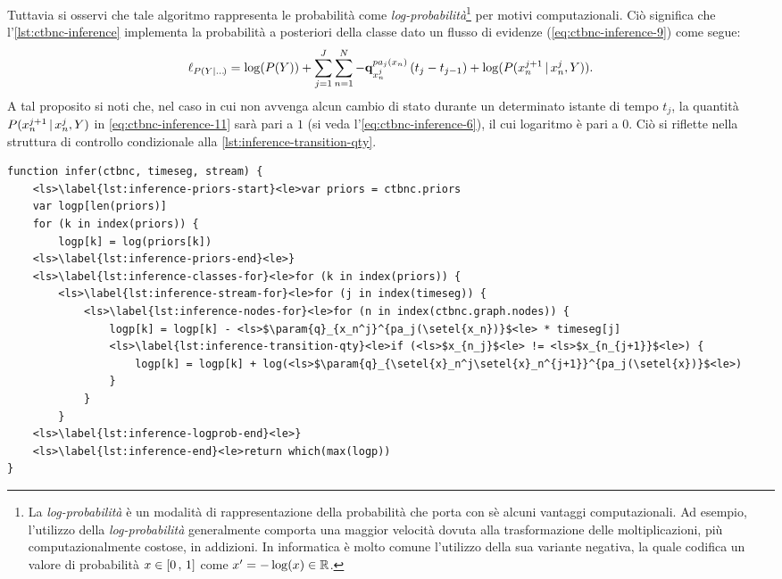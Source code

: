 Tuttavia si osservi che tale algoritmo rappresenta le probabilità come \emph{log-probabilità}\footnote{La \emph{log-probabilità} è un modalità di rappresentazione della probabilità che porta con sè alcuni vantaggi computazionali. Ad esempio, l'utilizzo della \emph{log-probabilità} generalmente comporta una maggior velocità dovuta alla trasformazione delle moltiplicazioni, più computazionalmente costose, in addizioni. In informatica è molto comune l'utilizzo della sua variante negativa, la quale codifica un valore di probabilità $\mathnormal{x} \in [0\,,\,1]$ come $\mathnormal{x}^{\prime}=-\log(\mathnormal{x}) \in \mathbb{R}$.} per motivi computazionali. Ciò significa che l'\autoref{lst:ctbnc-inference} implementa la probabilità a posteriori della classe dato un flusso di evidenze (\autoref{eq:ctbnc-inference-9}) come segue:
\small
\begin{equation}\label{eq:ctbnc-inference-11}
\ell_{P(\mathnormal{Y}|\dots\negthinspace{})} = \log (P(\mathnormal{Y})) + \sum_{j=1}^{J}\sum_{n=1}^N-\boldsymbol{\textbf{\text{q}}}_{\mathnormal{x}_n^j}^{pa_j(\mathnormal{x}_n)}\,(t_j - t_{j-1}) + \log (P(\mathnormal{x}_n^{j+1}\,\arrowvert\,\mathnormal{x}_n^j,\mathnormal{Y}))\text{\normalsize .}
\end{equation}
\normalsize
A tal proposito si noti che, nel caso in cui non avvenga alcun cambio di stato durante un determinato istante di tempo $t_j$, la quantità $P(\mathnormal{x}_n^{j+1}\,\arrowvert\,\mathnormal{x}_n^j,\mathnormal{Y})$ in \ref{eq:ctbnc-inference-11} sarà pari a $1$ (si veda l'\autoref{eq:ctbnc-inference-6}), il cui logaritmo è pari a $0$. Ciò si riflette nella struttura di controllo condizionale alla \autoref{lst:inference-transition-qty}.
\begin{lstlisting}[caption=Inferenza su un classificatore \acs{CTBN},label=lst:ctbnc-inference, language=pseudo]
function infer(ctbnc, timeseg, stream) {
    <ls>\label{lst:inference-priors-start}<le>var priors = ctbnc.priors
    var logp[len(priors)]
    for (k in index(priors)) {
        logp[k] = log(priors[k])
    <ls>\label{lst:inference-priors-end}<le>}
    <ls>\label{lst:inference-classes-for}<le>for (k in index(priors)) {
        <ls>\label{lst:inference-stream-for}<le>for (j in index(timeseg)) {
            <ls>\label{lst:inference-nodes-for}<le>for (n in index(ctbnc.graph.nodes)) {
                logp[k] = logp[k] - <ls>$\param{q}_{x_n^j}^{pa_j(\setel{x_n})}$<le> * timeseg[j]
                <ls>\label{lst:inference-transition-qty}<le>if (<ls>$x_{n_j}$<le> != <ls>$x_{n_{j+1}}$<le>) {
                    logp[k] = logp[k] + log(<ls>$\param{q}_{\setel{x}_n^j\setel{x}_n^{j+1}}^{pa_j(\setel{x})}$<le>)
                }
            }
        }
    <ls>\label{lst:inference-logprob-end}<le>}
    <ls>\label{lst:inference-end}<le>return which(max(logp))
}
\end{lstlisting}\vspace*{8pt}
